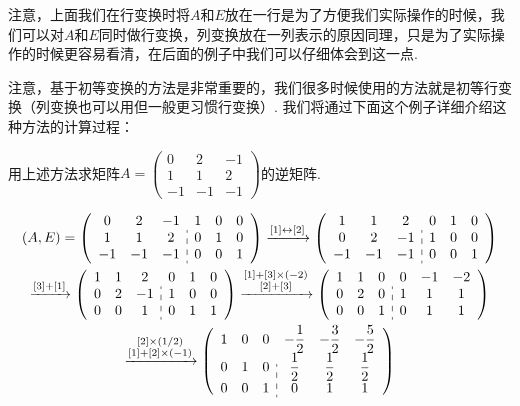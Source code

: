 注意，上面我们在行变换时将$A$和$E$放在一行是为了方便我们实际操作的时候，我们可以对$A$和$E$同时做行变换，列变换放在一列表示的原因同理，只是为了实际操作的时候更容易看清，在后面的例子中我们可以仔细体会到这一点.

注意，基于初等变换的方法是非常重要的，我们很多时候使用的方法就是初等行变换（列变换也可以用但一般更习惯行变换）. 我们将通过下面这个例子详细介绍这种方法的计算过程：
\begin{example}{}{}
    用上述方法求矩阵$A=\begin{pmatrix}0 & 2 & -1 \\ 1 & 1 & 2 \\ -1 & -1 & -1\end{pmatrix}$的逆矩阵.
\end{example}

\begin{solution}
    \begin{gather*}
        (A, E) =
        \left(\begin{array}{ccc:ccc}
                0  & 2  & -1 & 1 & 0 & 0 \\
                1  & 1  & 2  & 0 & 1 & 0 \\
                -1 & -1 & -1 & 0 & 0 & 1
            \end{array}\right)
        \xrightarrow{[1] \leftrightarrow [2]}
        \left(\begin{array}{ccc:ccc}
                1  & 1  & 2  & 0 & 1 & 0 \\
                0  & 2  & -1 & 1 & 0 & 0 \\
                -1 & -1 & -1 & 0 & 0 & 1
            \end{array}\right) \\
        \xrightarrow{[3] + [1]}
        \left(\begin{array}{ccc:ccc}
                1 & 1 & 2  & 0 & 1 & 0 \\
                0 & 2 & -1 & 1 & 0 & 0 \\
                0 & 0 & 1  & 0 & 1 & 1
            \end{array}\right)
        \xrightarrow{\substack{[1] + [3] \times (-2) \\ [2] + [3]}}
        \left(\begin{array}{ccc:ccc}
                1 & 1 & 0 & 0 & -1 & -2 \\
                0 & 2 & 0 & 1 & 1  & 1  \\
                0 & 0 & 1 & 0 & 1  & 1
            \end{array}\right) \\
        \xrightarrow{\substack{[2] \times (1/2) \\ [1] + [2] \times (-1)}}
        \left(
        \begin{array}{ccc:ccc}
                1 & 0 & 0 & -\dfrac{1}{2} & -\dfrac{3}{2} & -\dfrac{5}{2} \\
                0 & 1 & 0 & \dfrac{1}{2}  & \dfrac{1}{2}  & \dfrac{1}{2}  \\
                0 & 0 & 1 & 0            & 1            & 1
            \end{array}
        \right)
    \end{gather*}


\end{solution}
